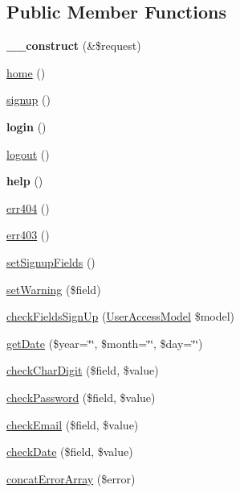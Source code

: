 \subsection*{Public Member Functions}
\begin{DoxyCompactItemize}
\item 
\hypertarget{classBasePageController_a483998015a3518d49897d271de2e3c2d}{{\bfseries \+\_\+\+\_\+construct} (\&\$request)}\label{classBasePageController_a483998015a3518d49897d271de2e3c2d}

\item 
\hyperlink{classBasePageController_addd9e4039a708810ae0e60b94649db57}{home} ()
\item 
\hyperlink{classBasePageController_aed3342fa72b2849f027fec00f1f88548}{signup} ()
\item 
\hypertarget{classBasePageController_ab8b972729d58ef6681fbe74bb22ffb6a}{{\bfseries login} ()}\label{classBasePageController_ab8b972729d58ef6681fbe74bb22ffb6a}

\item 
\hyperlink{classBasePageController_ad065341a301057b6b0dfc3b1e56ed56a}{logout} ()
\item 
\hypertarget{classBasePageController_a7d24305ce4d1a6062e9d363460902ae3}{{\bfseries help} ()}\label{classBasePageController_a7d24305ce4d1a6062e9d363460902ae3}

\item 
\hyperlink{classBasePageController_a34b8830d87502cefa09b06450f2b1fa7}{err404} ()
\item 
\hyperlink{classBasePageController_a8228e7e547a0bdc913cc1edfaca484fb}{err403} ()
\item 
\hyperlink{classBasePageController_a877c4f32b7d39e566f7832aef94c2f11}{set\+Signup\+Fields} ()
\item 
\hyperlink{classBasePageController_a777f34065716ce7f7706ea745fbdd254}{set\+Warning} (\$field)
\item 
\hyperlink{classBasePageController_a56e85dfb915144831cf39435b88774f5}{check\+Fields\+Sign\+Up} (\hyperlink{classUserAccessModel}{User\+Access\+Model} \$model)
\item 
\hyperlink{classBasePageController_a2aaad6f0fa836c9d7e6d9df5974cb4a7}{get\+Date} (\$year=\char`\"{}\char`\"{}, \$month=\char`\"{}\char`\"{}, \$day=\char`\"{}\char`\"{})
\item 
\hyperlink{classBasePageController_a34d606ee039e2042cf6727ac16dabb70}{check\+Char\+Digit} (\$field, \$value)
\item 
\hyperlink{classBasePageController_a6829b94ed721619b43879475c75b8fc8}{check\+Password} (\$field, \$value)
\item 
\hyperlink{classBasePageController_a5a0788181caf223a4ce208702c93e0c8}{check\+Email} (\$field, \$value)
\item 
\hyperlink{classBasePageController_a6f1a0a900ee8f95b6b6f12c52272a9a7}{check\+Date} (\$field, \$value)
\item 
\hyperlink{classBasePageController_ac0083ad81bbac88f3ca4bdf258566a07}{concat\+Error\+Array} (\$error)
\end{DoxyCompactItemize}
